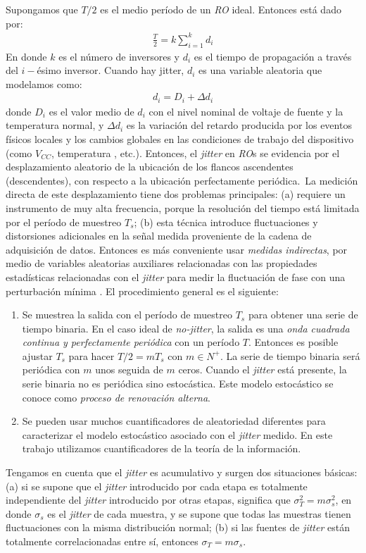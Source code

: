 Supongamos que $T/2$ es el medio período de un \emph{RO} ideal.
Entonces está dado por:
%
\begin{eqnarray}
\frac{T}{2}=k \sum_{i=1}^{k}d_i
\end{eqnarray}
%
En donde $k$ es el número de inversores y $d_i$ es el tiempo de propagación a través del $i-$ésimo inversor.
Cuando hay jitter, $d_i$ es una variable aleatoria que modelamos como:
%
\begin{eqnarray}
d_i=D_i+ \Delta d_i
\end{eqnarray}
%
donde $D_i$ es el valor medio de $d_i$ con el nivel nominal de voltaje de fuente y la temperatura normal, y $\Delta d_i$ es la variación del retardo producida por los eventos físicos locales y los cambios globales en las condiciones de trabajo del dispositivo (como $V_{CC}$, temperatura , etc.).
Entonces, el \textit{jitter} en \emph{RO}s se evidencia por el desplazamiento aleatorio de la ubicación de los flancos ascendentes (descendentes), con respecto a la ubicación perfectamente periódica.\
La medición directa de este desplazamiento tiene dos problemas principales:
(a) requiere un instrumento de muy alta frecuencia, porque la resolución del tiempo está limitada por el período de muestreo $T_s$;
(b) esta técnica introduce fluctuaciones y distorsiones adicionales en la señal medida proveniente de la cadena de adquisición de datos.
Entonces es más conveniente usar \emph{medidas indirectas}, por medio de variables aleatorias auxiliares relacionadas con las propiedades estadísticas relacionadas con el \textit{jitter} para medir la fluctuación de fase con una perturbación mínima \cite{Lubicz2014}.
El procedimiento general es el siguiente:
\begin{enumerate}
\item Se muestrea la salida con el período de muestreo $ T_s $ para obtener una serie de tiempo binaria.
En el caso ideal de \emph{no-jitter}, la salida es una \emph{onda cuadrada continua y perfectamente periódica} con un período $T$.
Entonces es posible ajustar $T_s$ para hacer $T/2 = mT_s $ con $m \in N^+$.
La serie de tiempo binaria será periódica con $m$ unos seguida de $m$ ceros.
Cuando el \textit{jitter} está presente, la serie binaria no es periódica sino estocástica.
Este modelo estocástico se conoce como \emph{proceso de renovación alterna}.
\item Se pueden usar muchos cuantificadores de aleatoriedad diferentes para caracterizar el modelo estocástico asociado con el \textit{jitter} medido.
En este trabajo utilizamos cuantificadores de la teoría de la información.
\end{enumerate}
Tengamos en cuenta que el \textit{jitter} es acumulativo y surgen dos situaciones básicas:
(a) si se supone que el \textit{jitter} introducido por cada etapa es totalmente independiente del \textit{jitter} introducido por otras etapas, significa que  $\sigma_T^2=m\sigma_s^2$, en donde $\sigma_s$ es el \textit{jitter} de cada muestra, y se supone que todas las muestras tienen fluctuaciones con la misma distribución normal;
(b) si las fuentes de \textit{jitter} están totalmente correlacionadas entre sí, entonces $\sigma_T=m\sigma_s$.